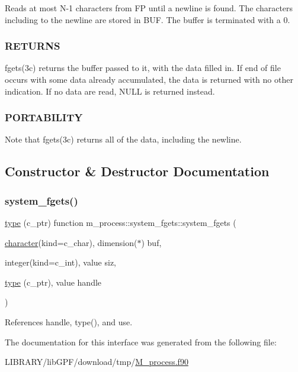 Reads at most N-\/1 characters from FP until a newline is found. The characters including to the newline are stored in B\+UF. The buffer is terminated with a 0. \subsubsection*{R\+E\+T\+U\+R\+NS}

fgets(3c) returns the buffer passed to it, with the data filled in. If end of file occurs with some data already accumulated, the data is returned with no other indication. If no data are read, N\+U\+LL is returned instead. \subsubsection*{P\+O\+R\+T\+A\+B\+I\+L\+I\+TY}

Note that fgets(3c) returns all of the data, including the newline. 

\subsection{Constructor \& Destructor Documentation}
\mbox{\label{interfacem__process_1_1system__fgets_a33f5f4ba1ea0fe4e0b757d7fa5e8a571}} 
\subsubsection{\texorpdfstring{system\+\_\+fgets()}{system\_fgets()}}
{\footnotesize\ttfamily \hyperlink{stop__watch_83_8txt_a70f0ead91c32e25323c03265aa302c1c}{type} (c\+\_\+ptr) function m\+\_\+process\+::system\+\_\+fgets\+::system\+\_\+fgets (\begin{DoxyParamCaption}\item[{\hyperlink{option__stopwatch_83_8txt_abd4b21fbbd175834027b5224bfe97e66}{character}(kind=c\+\_\+char), dimension($\ast$)}]{buf,  }\item[{integer(kind=c\+\_\+int), value}]{siz,  }\item[{\hyperlink{stop__watch_83_8txt_a70f0ead91c32e25323c03265aa302c1c}{type} (c\+\_\+ptr), value}]{handle }\end{DoxyParamCaption})\hspace{0.3cm}{\ttfamily [private]}}



References handle, type(), and use.



The documentation for this interface was generated from the following file\+:\begin{DoxyCompactItemize}
\item 
L\+I\+B\+R\+A\+R\+Y/lib\+G\+P\+F/download/tmp/\hyperlink{M__process_8f90}{M\+\_\+process.\+f90}\end{DoxyCompactItemize}
